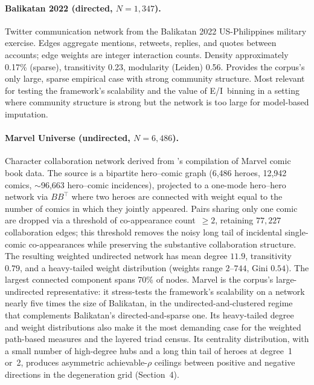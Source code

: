 \documentclass[11pt]{article}
\begin{document}
\paragraph{Balikatan 2022 (directed, $N = 1{,}347$).} Twitter communication network from the Balikatan 2022 US-Philippines military exercise. Edges aggregate mentions, retweets, replies, and quotes between accounts; edge weights are integer interaction counts. Density approximately 0.17\% (sparse), transitivity 0.23, modularity (Leiden) 0.56. Provides the corpus's only large, sparse empirical case with strong community structure. Most relevant for testing the framework's scalability and the value of E/I~binning in a setting where community structure is strong but the network is too large for model-based imputation.

\paragraph{Marvel Universe (undirected, $N = 6{,}486$).} Character collaboration network derived from \citet{AlberichMiroJuliaRossello2002}'s compilation of Marvel comic book data. The source is a bipartite hero--comic graph (6{,}486 heroes, 12{,}942 comics, $\sim$96{,}663 hero--comic incidences), projected to a one-mode hero--hero network via $B B^{\top}$ where two heroes are connected with weight equal to the number of comics in which they jointly appeared. Pairs sharing only one comic are dropped via a threshold of co-appearance count~$\geq 2$, retaining $77{,}227$ collaboration edges; this threshold removes the noisy long tail of incidental single-comic co-appearances while preserving the substantive collaboration structure. The resulting weighted undirected network has mean degree $11.9$, transitivity $0.79$, and a heavy-tailed weight distribution (weights range $2$--$744$, Gini $0.54$). The largest connected component spans 70\% of nodes. Marvel is the corpus's large-undirected representative: it stress-tests the framework's scalability on a network nearly five times the size of Balikatan, in the undirected-and-clustered regime that complements Balikatan's directed-and-sparse one. Its heavy-tailed degree and weight distributions also make it the most demanding case for the weighted path-based measures and the layered triad census. Its centrality distribution, with a small number of high-degree hubs and a long thin tail of heroes at degree~1 or~2, produces asymmetric achievable-$\rho$ ceilings between positive and negative directions in the degeneration grid (Section~4).
\end{document}

